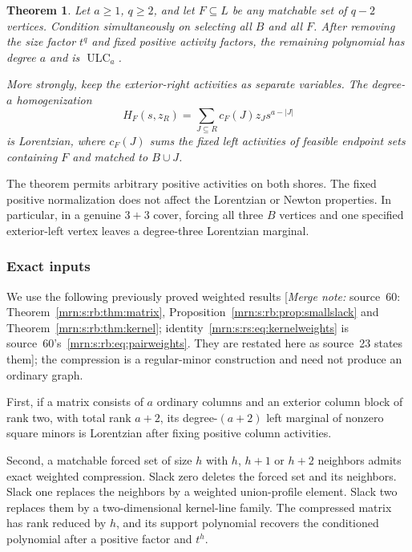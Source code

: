 \documentclass[11pt,a4paper]{article}
\newtheorem{theorem}{Theorem}[section]
\theoremstyle{remark}\newtheorem{remark}[theorem]{Remark}
\newcommand{\ULC}{\operatorname{ULC}}      %
\newcommand{\mnote}[1]{[\textit{Merge note:} #1]}
\begin{document}
\begin{theorem}\label{mrn:s:rs:thm:rooted}
Let $a\ge1$, $q\ge2$, and let $F\subseteq L$ be any matchable set of $q-2$ vertices. Condition simultaneously on selecting all $B$ and all $F$. After removing the size factor $t^q$ and fixed positive activity factors, the remaining polynomial has degree $a$ and is $\ULC_a$.

More strongly, keep the exterior-right activities as separate variables. The degree-$a$ homogenization
\[
 H_F(s,z_R)=\sum_{J\subseteq R}c_F(J)z_Js^{a-|J|}
\]
is Lorentzian, where $c_F(J)$ sums the fixed left activities of feasible endpoint sets containing $F$ and matched to $B\cup J$.
\end{theorem}

The theorem permits arbitrary positive activities on both shores. The fixed positive normalization does not affect the Lorentzian or Newton properties. In particular, in a genuine $3+3$ cover, forcing all three $B$ vertices and one specified exterior-left vertex leaves a degree-three Lorentzian marginal.

\subsubsection{Exact inputs}
We use the following previously proved weighted results \cite{b:m60} \mnote{source~60: Theorem~\ref{mrn:s:rb:thm:matrix}, Proposition~\ref{mrn:s:rb:prop:smallslack} and Theorem~\ref{mrn:s:rb:thm:kernel}; identity~\eqref{mrn:s:rs:eq:kernelweights} is source~60's~\eqref{mrn:s:rb:eq:pairweights}. They are restated here as source~23 states them}; the compression is a regular-minor construction and need not produce an ordinary graph.

First, if a matrix consists of $a$ ordinary columns and an exterior column block of rank two, with total rank $a+2$, its degree-$(a+2)$ left marginal of nonzero square minors is Lorentzian after fixing positive column activities.

Second, a matchable forced set of size $h$ with $h$, $h+1$ or $h+2$ neighbors admits exact weighted compression. Slack zero deletes the forced set and its neighbors. Slack one replaces the neighbors by a weighted union-profile element. Slack two replaces them by a two-dimensional kernel-line family. The compressed matrix has rank reduced by $h$, and its support polynomial recovers the conditioned polynomial after a positive factor and $t^h$.
\end{document}
